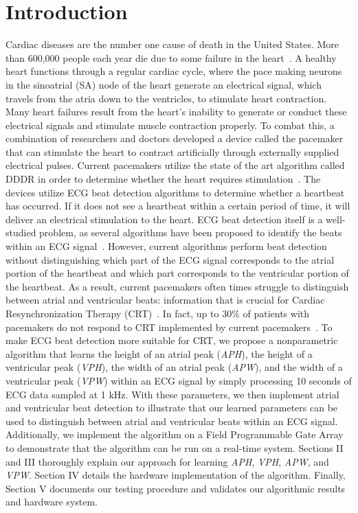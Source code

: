 \documentclass[conference]{IEEEtran}
\newcommand{\APW}{\textit{APW}}
\newcommand{\VPW}{\textit{VPW}}
\newcommand{\APH}{\textit{APH}}
\newcommand{\VPH}{\textit{VPH}}
\begin{document}
\section{Introduction}
Cardiac diseases are the number one cause of death in
the United States. More than 600,000 people each year
die due to some failure in the heart~\cite{death-stats}. A healthy heart
functions through a regular cardiac cycle, where the pace
making neurons in the sinoatrial (SA) node of the heart
generate an electrical signal, which travels from the atria
down to the ventricles, to stimulate heart contraction.
Many heart failures result from the heart's inability to
generate or conduct these electrical signals and stimulate
muscle contraction properly. To combat this, a
combination of researchers and doctors developed a
device called the pacemaker that can stimulate the heart
to contract artificially through externally supplied
electrical pulses.
Current pacemakers utilize the state of the art
algorithm called DDDR in order to determine whether
the heart requires stimulation~\cite{basic-pacing}. The devices utilize
ECG beat detection algorithms to determine whether a
heartbeat has occurred. If it does not see a heartbeat
within a certain period of time, it will deliver an
electrical stimulation to the heart.
ECG beat detection itself is a well-studied problem, as
several algorithms have been proposed to identify the
beats within an ECG signal~\cite{realtime-qrs, ecg-filter}. However, current
algorithms perform beat detection without distinguishing
which part of the ECG signal corresponds to the atrial
portion of the heartbeat and which part corresponds to
the ventricular portion of the heartbeat. As a result,
current pacemakers often times struggle to distinguish
between atrial and ventricular beats: information that is
crucial for Cardiac Resynchronization Therapy (CRT)~\cite{multisite-crt}.
In fact, up to 30\% of patients with pacemakers do
not respond to CRT implemented by current pacemakers~\cite{multisite-crt}.
To make ECG beat detection more suitable for CRT,
we propose a nonparametric algorithm that learns the
height of an atrial peak (\APH), the height of a ventricular
peak (\VPH), the width of an atrial peak (\APW), and the
width of a ventricular peak (\VPW) within an ECG signal
by simply processing 10 seconds of ECG data sampled
at 1 kHz. With these parameters, we then implement
atrial and ventricular beat detection to illustrate that our
learned parameters can be used to distinguish between
atrial and ventricular beats within an ECG signal.
Additionally, we implement the algorithm on a Field
Programmable Gate Array to demonstrate that the
algorithm can be run on a real-time system.
Sections II and III thoroughly explain our approach
for learning \APH{}, \VPH{}, \APW{}, and \VPW{}. Section IV
details the hardware implementation of the algorithm.
Finally, Section V documents our testing procedure and
validates our algorithmic results and hardware system.
\end{document}
